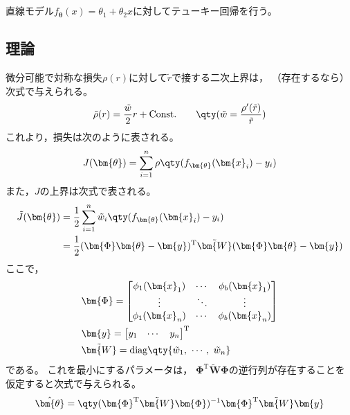 \documentclass[class=jsarticle, crop=false, dvipdfmx, fleqn]{standalone}
\begin{document}
\section{}

直線モデル\(f_{\bm{\theta}} (x) = \theta_1 + \theta_2 x\)に対してテューキー回帰を行う。


\subsection*{理論}

微分可能で対称な損失\(\rho(r)\)に対して\(\tilde{r}\)で接する二次上界は，
（存在するなら）次式で与えられる。
\begin{equation}
    \tilde{\rho}(r) = \frac{\tilde{w}}{2} r + \mathrm{Const.}
        \qquad \qty(\tilde{w} = \frac{\rho^\prime (\tilde{r})}{\tilde{r}})
\end{equation}
これより，損失は次のように表される。
\begin{equation}
    J(\bm{\theta}) = \sum_{i=1}^{n} \rho\qty(f_{\mathrm{\bm{\theta}}} (\bm{x}_i) - y_i)
\end{equation}
また，\(J\)の上界は次式で表される。
\begin{align}
    \tilde{J}(\bm{\theta})
        & = \frac{1}{2} \sum_{i=1}^{n} \tilde{w}_i \qty(f_{\mathrm{\bm{\theta}}} (\bm{x}_i) - y_i) \\
        & = \frac{1}{2} (\bm{\Phi}\bm{\theta} - \bm{y})^\mathrm{T} \tilde{\bm{W}} (\bm{\Phi}\bm{\theta} - \bm{y})
\end{align}
ここで，
\begin{align}
	& \bm{\Phi} =
		\begin{bmatrix}
			\phi_1 (\bm{x}_1) & \cdots & \phi_b (\bm{x}_1) \\
			\vdots & \ddots & \vdots \\
			\phi_1 (\bm{x}_n) & \cdots & \phi_b (\bm{x}_n) \\
		\end{bmatrix} \\
	& \bm{y} =
		\begin{bmatrix}
			y_1 & \cdots & y_n
		\end{bmatrix}^\mathrm{T} \\
	& \tilde{\bm{W}} = \mathrm{diag}\qty{\tilde{w}_1,\ \cdots,\ \tilde{w}_n}
\end{align}
である。
これを最小にするパラメータは，
\(\bm{\Phi}^\mathrm{T}\tilde{\bm{W}}\bm{\Phi}\)の逆行列が存在することを仮定すると次式で与えられる。
\begin{equation}
    \hat{\bm{\theta}} = \qty(\bm{\Phi}^\mathrm{T}\tilde{\bm{W}}\bm{\Phi})^{-1} \bm{\Phi}^\mathrm{T} \tilde{\bm{W}}\bm{y}
    \label{eq:theta}
\end{equation}
\end{document}
